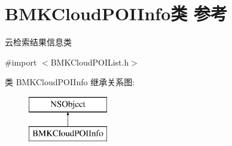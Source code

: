 \hypertarget{interface_b_m_k_cloud_p_o_i_info}{\section{B\+M\+K\+Cloud\+P\+O\+I\+Info类 参考}
\label{interface_b_m_k_cloud_p_o_i_info}
}


云检索结果信息类  




{\ttfamily \#import $<$B\+M\+K\+Cloud\+P\+O\+I\+List.\+h$>$}

类 B\+M\+K\+Cloud\+P\+O\+I\+Info 继承关系图\+:\begin{figure}[H]
\begin{center}
\leavevmode
\includegraphics[height=2.000000cm]{interface_b_m_k_cloud_p_o_i_info}
\end{center}
\end{figure}
